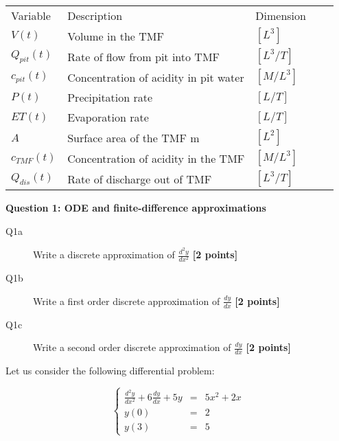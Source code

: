 \documentclass{article}
\begin{document}
\begin{table}[]
\begin{tabular}{lllll}
Variable & Description    & Dimension  \\
$V(t)$ &  Volume in the TMF                               & $[L^3]$ \\
 $Q_{pit}(t)$    & Rate of flow from pit into TMF      & $[L^3/T]$\\
 $c_{pit}(t)$     & Concentration of acidity in pit water & $[M/L^3]$\\
 $P(t)$            & Precipitation rate                       & $[L/T]$ \\
$ET(t)$          & Evaporation rate                    & $[L/T]$  \\
$A$               & Surface area of the TMF m           &$[L^2]$  \\
 $c_{TMF}(t)$ & Concentration of acidity in the TMF & $[M/L^3]$ \\
 $Q_{dis}(t)$   & Rate of discharge out of TMF      & $[L^3/T]$ 

\end{tabular}
\end{table}



\textbf{Question 1: ODE and finite-difference approximations}

\begin{description}
\item [Q1a] Write a discrete approximation of $\frac{d^2y}{dx^2}$ \textbf{[2 points]}
\vspace{3cm}
\item [Q1b] Write a first order discrete approximation of $\frac{dy}{dx}$ \textbf{[2 points]}
\vspace{3.5cm}

\item [Q1c] Write a second order discrete approximation of $\frac{dy}{dx}$ \textbf{[2 points]}
\vspace{3.5cm}

\end{description}

Let us consider the following differential problem:

\begin{equation}
\left\lbrace
\begin{array}{lll}
\displaystyle{\frac{d^2y}{dx^2}} +6  \displaystyle{\frac{dy}{dx}} + 5y &=& 5x^2 + 2x \\
y(0) &=& 2 \\
y(3) & = & 5
\end{array}
\right. \label{eq:diffprob}
\end{equation}
\end{document}
